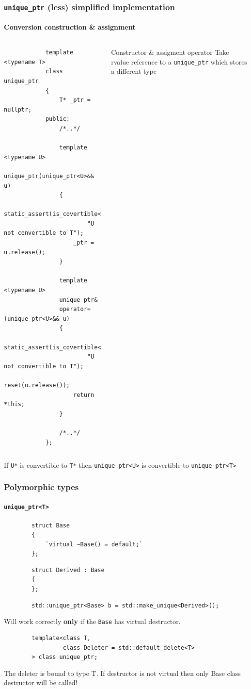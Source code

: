 \documentclass{beamer}
\begin{document}
\begin{frame}[fragile]
\frametitle{\texttt{unique\_ptr} (less) simplified implementation}
\framesubtitle{Conversion construction \& assignment}
	\begin{columns}[t]
		\begin{lstlisting}
			template <typename T>
			class unique_ptr
			{
			    T* _ptr = nullptr;
			public:
				/*..*/
				
				template <typename U>
				unique_ptr(unique_ptr<U>&& u)
				{
					static_assert(is_covertible<U*,T*>::value,
						"U not convertible to T");
					_ptr = u.release();
				}
				
				template <typename U>
				unique_ptr&
			    operator=(unique_ptr<U>&& u)
			    {
			    	static_assert(is_covertible<U*,T*>::value,
						"U not convertible to T");
			        reset(u.release());
			        return *this;
			    }		
			
				/*..*/
			};
		\end{lstlisting}
		\begin{block}{Constructor \& assigment operator}
			Take rvalue reference to a \texttt{unique\_ptr} which stores a different type
		\end{block}			
	\end{columns}
\end{frame}

\begin{frame}
	If \texttt{U*} is convertible to \texttt{T*} then
	\texttt{unique\_ptr<U>} is convertible to \texttt{unique\_ptr<T>}
\end{frame}

\begin{frame}[fragile,t]
\frametitle{Polymorphic types}
\framesubtitle{\texttt{unique\_ptr<T>}}
	\begin{lstlisting}
		struct Base
		{
			`virtual ~Base() = default;`
		};
	\end{lstlisting}
	\begin{lstlisting}	
		struct Derived : Base
		{
		};	
	\end{lstlisting}
    \hrulefill
	\begin{lstlisting}	
		std::unique_ptr<Base> b = std::make_unique<Derived>();
	\end{lstlisting}
    \hrulefill \newline
	Will work correctly \textbf{only} if the \texttt{Base} has virtual destructor.
	\pause
	\begin{block}{}
		\begin{lstlisting}
		template<class T,
				 class Deleter = std::default_delete<T>
		> class unique_ptr;
		\end{lstlisting}
	\end{block}
	The deleter is bound to type T. If destructor is not virtual then only Base class
	destructor will be called!
\end{frame}
\end{document}
